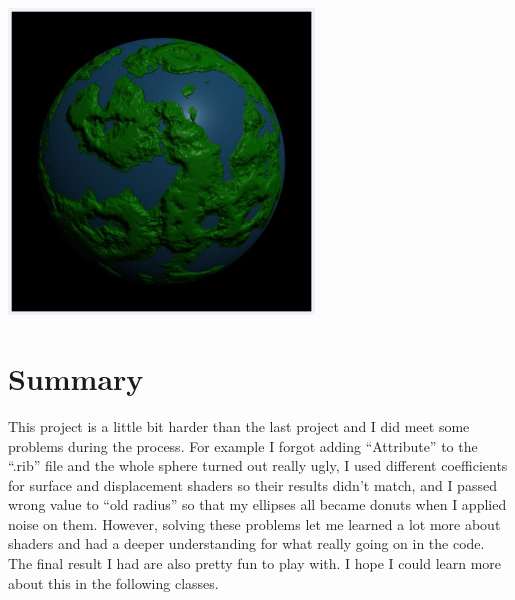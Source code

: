 \documentclass[letterpaper,14pt,titlepage,fleqn]{article}
\begin{document}
\begin{center}
	\includegraphics*[width=3.2in]{bump_mag_03.jpg}
\end{center}
\section{Summary}
This project is a little bit harder than the last project and I did meet some problems during the process. For example I forgot adding ``Attribute'' to the ``.rib'' file and the whole sphere turned out really ugly, I used different coefficients for surface and displacement shaders so their results didn't match, and I passed wrong value to ``old radius'' so that my ellipses all became donuts when I applied noise on them. However, solving these problems let me learned a lot more about shaders and had a deeper understanding for what really going on in the code. The final result I had are also pretty fun to play with. I hope I could learn more about this in the following classes.
\end{document}
